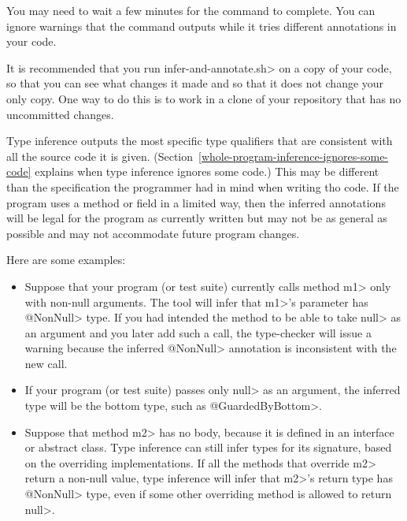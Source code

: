 You may need to wait a few minutes for the command to complete.
You can ignore warnings that the command outputs while it tries different
annotations in your code.

It is recommended that you run \<infer-and-annotate.sh> on a copy of your
code, so that you can see what changes it made and so that it does not
change your only copy.  One way to do this is to work in a clone of your
repository that has no uncommitted changes.



Type inference outputs the most specific type qualifiers that are
consistent with all the source code it is given.
(Section~\ref{whole-program-inference-ignores-some-code}
explains when type inference ignores some code.)
This may be different than the specification the programmer had in mind
when writing tho code.
If the program uses a method or field in a limited way, then the inferred
annotations will be legal for the program as
currently written but may not be as general as possible and may not
accommodate future program changes.

Here are some examples:

\begin{itemize}
\item
Suppose that your program (or test suite) currently calls
method \<m1> only with non-null
arguments.  The tool will infer that \<m1>'s parameter has
\<@NonNull> type.  If you had intended the method to be able to
take \<null> as an argument and you later add such a call, the type-checker
will issue a warning because the inferred \<@NonNull>
annotation is inconsistent with the new call.

\item
If your program (or test suite) passes only \<null> as an argument, the
inferred type will be the bottom type, such as \<@GuardedByBottom>.

\item
Suppose that method \<m2> has no body, because it is defined in an interface or
abstract class.
Type inference can still infer types for its signature, based on the
overriding implementations.
If all the methods that override \<m2> return a non-null value, type
inference will infer that \<m2>'s return type has \<@NonNull> type, even if
some other overriding method is allowed to return
\<null>.

\end{itemize}

